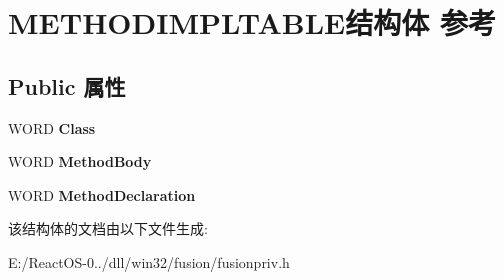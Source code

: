 \hypertarget{struct_m_e_t_h_o_d_i_m_p_l_t_a_b_l_e}{}\section{M\+E\+T\+H\+O\+D\+I\+M\+P\+L\+T\+A\+B\+L\+E结构体 参考}
\label{struct_m_e_t_h_o_d_i_m_p_l_t_a_b_l_e}
\subsection*{Public 属性}
\begin{DoxyCompactItemize}
\item 
\mbox{\label{struct_m_e_t_h_o_d_i_m_p_l_t_a_b_l_e_a0df8e7ca3f2cb5137ea390fe990ad167}} 
W\+O\+RD {\bfseries Class}
\item 
\mbox{\label{struct_m_e_t_h_o_d_i_m_p_l_t_a_b_l_e_afda4f91086fb11f0d24a23134df1ae27}} 
W\+O\+RD {\bfseries Method\+Body}
\item 
\mbox{\label{struct_m_e_t_h_o_d_i_m_p_l_t_a_b_l_e_aea007527f0b5106f4f6309e8026aaf95}} 
W\+O\+RD {\bfseries Method\+Declaration}
\end{DoxyCompactItemize}


该结构体的文档由以下文件生成\+:\begin{DoxyCompactItemize}
\item 
E\+:/\+React\+O\+S-\/0../dll/win32/fusion/fusionpriv.\+h\end{DoxyCompactItemize}
